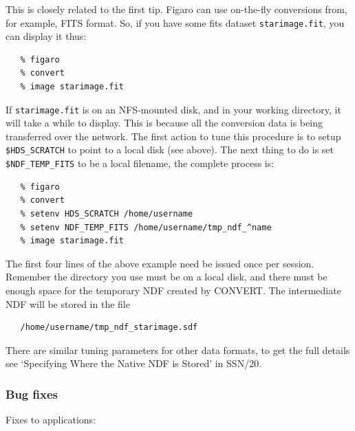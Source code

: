 \begin{enumerate}
      This is closely related to the first tip.  Figaro can use
      on-the-fly conversions from, for example, FITS format.
      So, if you have some fits dataset \verb+starimage.fit+, you can
      display it thus:

\begin{verbatim}
   % figaro
   % convert
   % image starimage.fit
\end{verbatim}

      If \verb+starimage.fit+ is on an NFS-mounted disk, and in your
      working
      directory, it will take a while to display.  This is because all
      the conversion data is being transferred over the network.
      The first action to tune this procedure is to setup
      \verb+$HDS_SCRATCH+
      to point to a local disk (see above).  The next thing to do is
      set \verb+$NDF_TEMP_FITS+ to be a local filename,
      the complete process is:

\begin{verbatim}
   % figaro
   % convert
   % setenv HDS_SCRATCH /home/username
   % setenv NDF_TEMP_FITS /home/username/tmp_ndf_^name
   % image starimage.fit
\end{verbatim}

      The first four lines of the above example need be issued once per
      session.
      Remember the directory you use must be on a local disk, and there
      must be enough space for the temporary NDF created by CONVERT.
      The intermediate NDF will be stored in the file

\begin{verbatim}
   /home/username/tmp_ndf_starimage.sdf
\end{verbatim}

      There are similar tuning parameters for other data formats, to
      get the full details see `Specifying Where the Native NDF is
      Stored' in SSN/20.

\end{enumerate}

\subsubsection{Bug fixes}

   Fixes to applications:

